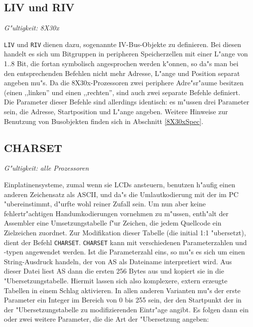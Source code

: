 \documentclass[12pt,a4paper,twoside]{report}
\makeatletter
\newcommand{\tty}[1]{{\tt #1}}
\newcommand{\ttindex}[1]{\index{#1@{\tt #1}}}
\makeatother
\begin{document}

\subsection{LIV und RIV}
\ttindex{LIV}\ttindex{RIV}

{\em G"ultigkeit: 8X30x}

\tty{LIV} und \tty{RIV} dienen dazu, sogenannte IV-Bus-Objekte zu definieren.
Bei diesen handelt es sich um Bitgruppen in peripheren Speicherzellen
mit einer L"ange von 1..8 Bit, die fortan symbolisch angesprochen
werden k"onnen, so da"s man bei den entsprechenden Befehlen nicht mehr
Adresse, L"ange und Position separat angeben mu"s.  Da die
8X30x-Prozessoren zwei periphere Adre"sr"aume besitzen (einen ,,linken''
und einen ,,rechten'', sind auch zwei separate Befehle definiert.  Die
Parameter dieser Befehle sind allerdings identisch: es m"ussen drei
Parameter sein, die Adresse, Startposition und L"ange angeben.
Weitere Hinweise zur Benutzung von Busobjekten finden sich in
Abschnitt \ref{8X30xSpec}.


\subsection{CHARSET}
\ttindex{CHARSET}

{\em G"ultigkeit: alle Prozessoren}

Einplatinensysteme, zumal wenn sie LCDs ansteuern, benutzen h"aufig
einen anderen Zeichensatz als ASCII, und da"s die Umlautkodierung mit
der im PC "ubereinstimmt, d"urfte wohl reiner Zufall sein.  Um nun
aber keine fehlertr"achtigen Handumkodierungen vornehmen zu m"ussen,
enth"alt der Assembler eine Umsetzungstabelle f"ur Zeichen, die jedem
Quellcode ein Zielzeichen zuordnet.  Zur Modifikation dieser Tabelle
(die initial 1:1 "ubersetzt), dient der Befehl \tty{CHARSET}.
\tty{CHARSET} kann mit verschiedenen Parameterzahlen und -typen angewendet
werden.  Ist die Parameterzahl eins, so mu"s es sich um einen
String-Ausdruck handeln, der von AS als Dateiname interpretiert wird.  Aus
dieser Datei liest AS dann die ersten 256 Bytes aus und kopiert sie in die
"Ubersetzungstabelle.  Hiermit lassen sich also komplexere, extern
erzeugte Tabellen in einem Schlag aktivieren.  In allen anderen Varianten
mu"s der erste Parameter ein Integer im Bereich von 0 bis 255 sein, der
den Startpunkt der in der "Ubersetzungstabelle zu modifizierenden
Eintr"age angibt.  Es folgen dann ein oder zwei weitere Parameter, die die
Art der "Ubersetzung angeben:
\end{document}
